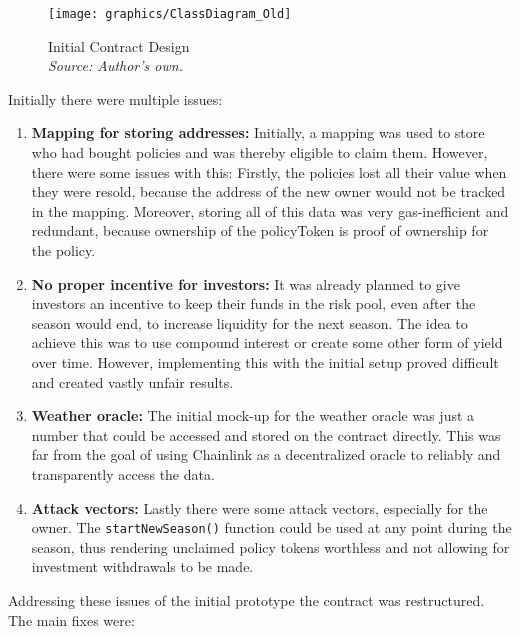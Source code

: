 \documentclass[11pt,a4paper]{article}
\begin{document}
        \begin{figure}[htbp]
            \centering
            \texttt{[image: graphics/ClassDiagram\_Old]}
            \caption{Initial Contract Design \\ \textit{Source: Author's own.}}
            \label{fig:initial-contract-design}
        \end{figure}


        \pagebreak

        Initially there were multiple issues:

		\begin{enumerate}[1]
		\item \textbf{Mapping for storing addresses:} Initially, a mapping was used to store who had bought policies and was thereby eligible to claim them.
		However, there were some issues with this: Firstly, the policies lost all their value when they were resold, because the address of the new owner would not be tracked in the mapping.
		Moreover, storing all of this data was very gas-inefficient and redundant, because ownership of the policyToken is proof of ownership for the policy.
		\item \textbf{No proper incentive for investors:} It was already planned to give investors an incentive to keep their funds in the risk pool, even after the season would end, to increase liquidity for the next season.
		The idea to achieve this was to use compound interest or create some other form of yield over time.
		However, implementing this with the initial setup proved difficult and created vastly unfair results.
		\item \textbf{Weather oracle:} The initial mock-up for the weather oracle was just a number that could be accessed and stored on the contract directly.
		This was far from the goal of using Chainlink as a decentralized oracle to reliably and transparently access the data.
		\item \textbf{Attack vectors:} Lastly there were some attack vectors, especially for the owner.
		The \texttt{startNewSeason()} function could be used at any point during the season, thus rendering unclaimed policy tokens worthless and not allowing for investment withdrawals to be made.
		\end{enumerate}

        \pagebreak

		Addressing these issues of the initial prototype the contract was restructured.
		The main fixes were:
\end{document}
